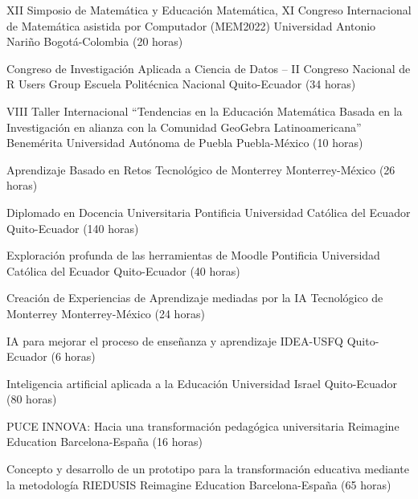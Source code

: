 \documentclass[
    a4paper,
    maincolor=cvblue!70!blue,
    sidecolor=gray!30,
    sectioncolor=cvblue!70!blue,
    sidebarwidth=7.5cm,
    topbottommargin=20pt,
    leftrightmargin=20pt,
]{fortysecondscv}
\begin{document}
    {XII Simposio de Matemática y Educación Matemática, XI Congreso Internacional de Matemática asistida por Computador (MEM2022)}
    {Universidad Antonio Nariño}
    {Bogotá-Colombia (20 horas)}

    {Congreso de Investigación Aplicada a Ciencia de Datos – II Congreso Nacional de R Users Group}
    {Escuela Politécnica Nacional}
    {Quito-Ecuador (34 horas)}

    {VIII Taller Internacional “Tendencias en la Educación Matemática Basada en la Investigación en alianza con la Comunidad GeoGebra Latinoamericana”}
    {Benemérita Universidad Autónoma de Puebla}
    {Puebla-México (10 horas)}



    {Aprendizaje Basado en Retos}
    {Tecnológico de Monterrey}
    {Monterrey-México (26 horas)}

    {Diplomado en Docencia Universitaria}
    {Pontificia Universidad Católica del Ecuador}
    {Quito-Ecuador (140 horas)}

    {Exploración profunda de las herramientas de Moodle}
    {Pontificia Universidad Católica del Ecuador}
    {Quito-Ecuador (40 horas)}

    {Creación de Experiencias de Aprendizaje mediadas por la IA}
    {Tecnológico de Monterrey}
    {Monterrey-México (24 horas)}

    {IA para mejorar el proceso de enseñanza y aprendizaje}
    {IDEA-USFQ}
    {Quito-Ecuador (6 horas)}

    {Inteligencia artificial aplicada a la Educación}
    {Universidad Israel}
    {Quito-Ecuador (80 horas)}

    {PUCE INNOVA: Hacia una transformación pedagógica universitaria}
    {Reimagine Education}
    {Barcelona-España (16 horas)}

    {Concepto y desarrollo de un prototipo para la transformación educativa mediante la metodología RIEDUSIS}
    {Reimagine Education}
    {Barcelona-España (65 horas)}
\end{document}
